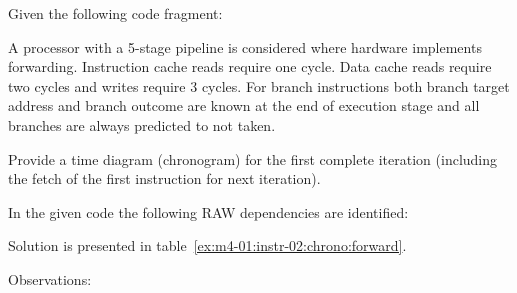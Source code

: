 \begin{acexercise}\end{acexercise}
\label{ex:m4-01:instr-02}

Given the following code fragment:



A processor with a 5-stage pipeline is considered where hardware implements forwarding.
Instruction cache reads require one cycle. Data cache reads require two cycles and
writes require 3 cycles. For branch instructions both branch target address and
branch outcome are known at the end of execution stage and all branches are
always predicted to not taken.

Provide a time diagram (chronogram) for the first complete iteration
(including the fetch of the first instruction for next iteration).

\begin{acsolution}\end{acsolution}

In the given code the following RAW dependencies are identified:


Solution is presented in table~\ref{ex:m4-01:instr-02:chrono:forward}.

Observations:

